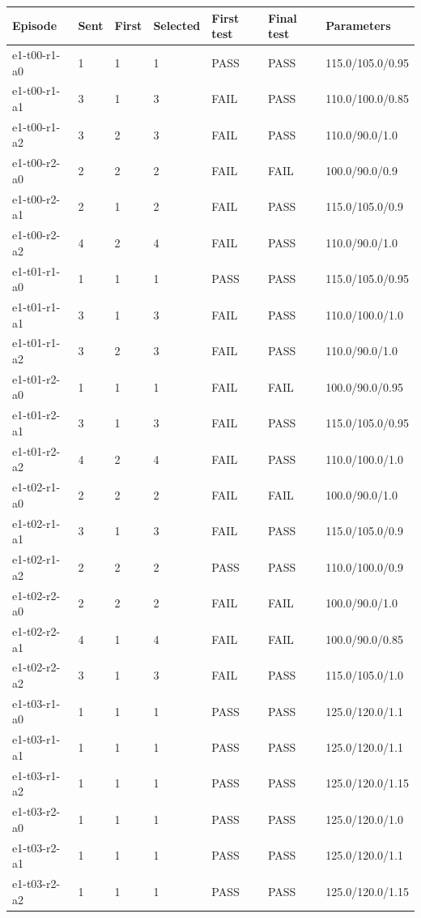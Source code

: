 \begin{longtable}{lllllll}
\toprule
Episode & Sent & First & Selected & First test & Final test & Parameters \\
\midrule
\endhead
e1-t00-r1-a0 & 1 & 1 & 1 & PASS & PASS & 115.0/105.0/0.95 \\
e1-t00-r1-a1 & 3 & 1 & 3 & FAIL & PASS & 110.0/100.0/0.85 \\
e1-t00-r1-a2 & 3 & 2 & 3 & FAIL & PASS & 110.0/90.0/1.0 \\
e1-t00-r2-a0 & 2 & 2 & 2 & FAIL & FAIL & 100.0/90.0/0.9 \\
e1-t00-r2-a1 & 2 & 1 & 2 & FAIL & PASS & 115.0/105.0/0.9 \\
e1-t00-r2-a2 & 4 & 2 & 4 & FAIL & PASS & 110.0/90.0/1.0 \\
e1-t01-r1-a0 & 1 & 1 & 1 & PASS & PASS & 115.0/105.0/0.95 \\
e1-t01-r1-a1 & 3 & 1 & 3 & FAIL & PASS & 110.0/100.0/1.0 \\
e1-t01-r1-a2 & 3 & 2 & 3 & FAIL & PASS & 110.0/90.0/1.0 \\
e1-t01-r2-a0 & 1 & 1 & 1 & FAIL & FAIL & 100.0/90.0/0.95 \\
e1-t01-r2-a1 & 3 & 1 & 3 & FAIL & PASS & 115.0/105.0/0.95 \\
e1-t01-r2-a2 & 4 & 2 & 4 & FAIL & PASS & 110.0/100.0/1.0 \\
e1-t02-r1-a0 & 2 & 2 & 2 & FAIL & FAIL & 100.0/90.0/1.0 \\
e1-t02-r1-a1 & 3 & 1 & 3 & FAIL & PASS & 115.0/105.0/0.9 \\
e1-t02-r1-a2 & 2 & 2 & 2 & PASS & PASS & 110.0/100.0/0.9 \\
e1-t02-r2-a0 & 2 & 2 & 2 & FAIL & FAIL & 100.0/90.0/1.0 \\
e1-t02-r2-a1 & 4 & 1 & 4 & FAIL & FAIL & 100.0/90.0/0.85 \\
e1-t02-r2-a2 & 3 & 1 & 3 & FAIL & PASS & 115.0/105.0/1.0 \\
e1-t03-r1-a0 & 1 & 1 & 1 & PASS & PASS & 125.0/120.0/1.1 \\
e1-t03-r1-a1 & 1 & 1 & 1 & PASS & PASS & 125.0/120.0/1.1 \\
e1-t03-r1-a2 & 1 & 1 & 1 & PASS & PASS & 125.0/120.0/1.15 \\
e1-t03-r2-a0 & 1 & 1 & 1 & PASS & PASS & 125.0/120.0/1.0 \\
e1-t03-r2-a1 & 1 & 1 & 1 & PASS & PASS & 125.0/120.0/1.1 \\
e1-t03-r2-a2 & 1 & 1 & 1 & PASS & PASS & 125.0/120.0/1.15 \\

\end{longtable}
